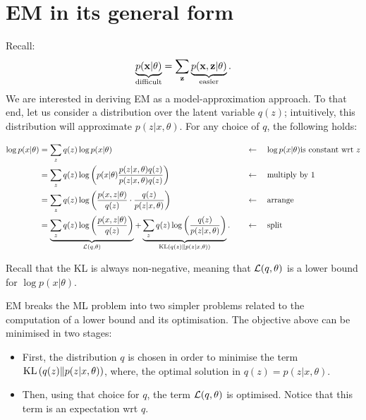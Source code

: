 \section{EM in its general form}

Recall: 
\begin{equation}
    \underbrace{p({ \mathbf{x}}|\theta)}_{\text{difficult}} = \sum_{ \mathbf{z}} \underbrace{p({ \mathbf{x}},{ \mathbf{z}}|\theta)}_{\text{easier}}.
\end{equation}
We are interested in deriving EM as a model-approximation approach. To that end, let us consider a distribution over the latent variable $q(z)$; intuitively, this distribution will approximate $p(z|x,\theta)$. For any choice of $q$, the following holds: 

\begin{align*}
    \log p(x|\theta) 
    &=  \sum_{z} q(z) \log p(x|\theta) \quad &&\leftarrow \quad \log p(x|\theta) \text{is constant wrt } z\\
    &=  \sum_{z} q(z) \log \left(p(x|\theta) \frac{p(z|x,\theta)q(z)}{p(z|x,\theta)q(z)}\right)  \quad &&\leftarrow \quad \text{multiply by 1}\\
    &=  \sum_{z} q(z) \log \left( \frac{p(x,z|\theta)}{q(z)}\cdot \frac{q(z)}{p(z|x,\theta)} \right)  \quad &&\leftarrow \quad \text{arrange}\\
    &= \underbrace{\sum_{z} q(z) \log \left( \frac{p(x,z|\theta)}{q(z)} \right)}_{{\mathcal L}(q,\theta)} + \underbrace{\sum_{z} q(z) \log \left( \frac{q(z)}{p(z|x,\theta)} \right)}_{\text{KL}\left(q(z)\middle\|p(z|x,\theta)\right)}.  \quad &&\leftarrow \quad \text{split}\\
\end{align*}

\begin{remark}
    Recall that the KL is always non-negative, meaning that ${\mathcal L}(q,\theta)$ is a lower bound for $\log p(x|\theta)$.
\end{remark}

EM breaks the ML problem into two simpler problems related to the computation of a lower bound and its optimisation. The objective above can be minimised in two stages: 
\begin{itemize}
    \item First, the distribution $q$ is chosen in order to minimise the term $\text{KL}\left(q(z)\middle\|p(z|x,\theta)\right)$, where, the optimal solution in $q(z) = p(z|x,\theta)$.
    \item Then, using that choice for $q$, the term ${\mathcal L}(q,\theta)$ is optimised. Notice that this term is an expectation  wrt $q$.
\end{itemize}

